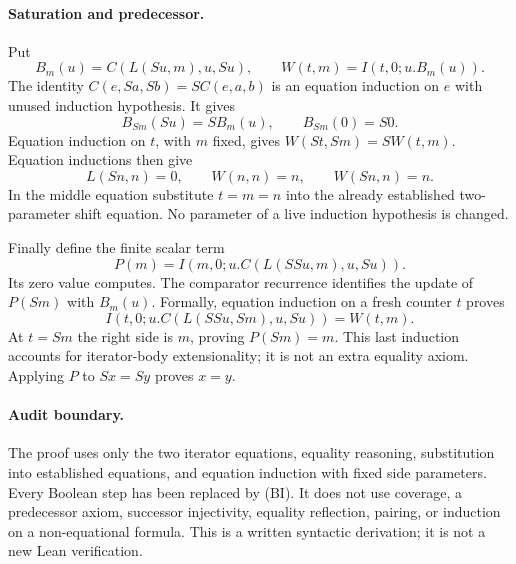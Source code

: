 \paragraph{Saturation and predecessor.}
Put
\[
 B_m(u)=C(L(Su,m),u,Su),\qquad W(t,m)=I(t,0;u.B_m(u)).
\]
The identity $C(e,Sa,Sb)=SC(e,a,b)$ is an equation induction on $e$
with unused induction hypothesis.  It gives
\[
 B_{Sm}(Su)=SB_m(u),\qquad B_{Sm}(0)=S0.
\]
Equation induction on $t$, with $m$ fixed, gives
$W(St,Sm)=SW(t,m)$.  Equation inductions then give
\[
 L(Sn,n)=0,\qquad W(n,n)=n,\qquad W(Sn,n)=n.
\]
In the middle equation substitute $t=m=n$ into the already established
two-parameter shift equation.  No parameter of a live induction hypothesis
is changed.

Finally define the finite scalar term
\[
 P(m)=I(m,0;u.C(L(SSu,m),u,Su)).
\]
Its zero value computes.  The comparator recurrence identifies the update
of $P(Sm)$ with $B_m(u)$.  Formally, equation induction on a fresh counter
$t$ proves
\[
 I(t,0;u.C(L(SSu,Sm),u,Su))=W(t,m).
\]
At $t=Sm$ the right side is $m$, proving $P(Sm)=m$.  This last
induction accounts for iterator-body extensionality; it is not an extra
equality axiom.  Applying $P$ to $Sx=Sy$ proves $x=y$.

\paragraph{Audit boundary.}
The proof uses only the two iterator equations, equality reasoning,
substitution into established equations, and equation induction with fixed
side parameters.  Every Boolean step has been replaced by (BI).  It does
not use coverage, a predecessor axiom, successor injectivity, equality
reflection, pairing, or induction on a non-equational formula.  This is a
written syntactic derivation; it is not a new Lean verification.
